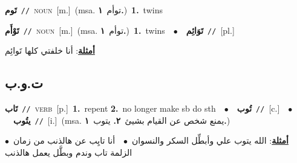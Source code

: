 \documentclass[10pt,a4paper,twoside]{article} %
\begin{document}
\begin{multicols}{2}
{\setlength\topsep{0pt}\textbf{\foreignlanguage{arabic}{تَوم}}\ {\color{gray}\texttt{//}\color{black}}\ \textsc{noun}\ [m.]\ \color{gray}(msa. \foreignlanguage{arabic}{توأم}~\foreignlanguage{arabic}{\textbf{١.}})\color{black}\ \textbf{1.}~twins\ } \vspace{2mm}

{\setlength\topsep{0pt}\textbf{\foreignlanguage{arabic}{تَوْأَم}}\ {\color{gray}\texttt{//}\color{black}}\ \textsc{noun}\ [m.]\ \color{gray}(msa. \foreignlanguage{arabic}{توأم}~\foreignlanguage{arabic}{\textbf{١.}})\color{black}\ \textbf{1.}~twins\ \ $\bullet$\ \ \setlength\topsep{0pt}\textbf{\foreignlanguage{arabic}{تَوَائِم}}\ {\color{gray}\texttt{//}\color{black}}\ [pl.]\  \begin{flushright}\color{gray}\foreignlanguage{arabic}{\textbf{\underline{\foreignlanguage{arabic}{أمثلة}}}: أنا خلفتي كلها تَوائِم}\end{flushright}\color{black}} \vspace{2mm}

\vspace{-3mm}
\subsection*{\color{blue}\foreignlanguage{arabic}{ت.و.ب}\color{blue}{}} 

{\setlength\topsep{0pt}\textbf{\foreignlanguage{arabic}{تَاب}}\ {\color{gray}\texttt{//}\color{black}}\ \textsc{verb}\ [p.]\ \textbf{1.}~repent  \textbf{2.}~no longer make sb do sth\ \ $\bullet$\ \ \setlength\topsep{0pt}\textbf{\foreignlanguage{arabic}{تُوب}}\ {\color{gray}\texttt{//}\color{black}}\ [c.]\ \ $\bullet$\ \ \setlength\topsep{0pt}\textbf{\foreignlanguage{arabic}{يتُوب}}\ {\color{gray}\texttt{//}\color{black}}\ [i.]\ \color{gray}(msa. \foreignlanguage{arabic}{يمنع شخص عن القيام بشيئ}~\foreignlanguage{arabic}{\textbf{٢.}}  \foreignlanguage{arabic}{يتوب}~\foreignlanguage{arabic}{\textbf{١.}})\color{black}\  \begin{flushright}\color{gray}\foreignlanguage{arabic}{\textbf{\underline{\foreignlanguage{arabic}{أمثلة}}}: الله يتوب علي وأبطِّل السكر والنسوان\ $\bullet$\ \  أنا تايِب عن هالذنب من زمان\ $\bullet$\ \  الزلمة تاب وندم وبطَّل يعمل هالذنب}\end{flushright}\color{black}} \vspace{2mm}


\end{multicols}
\end{document}
